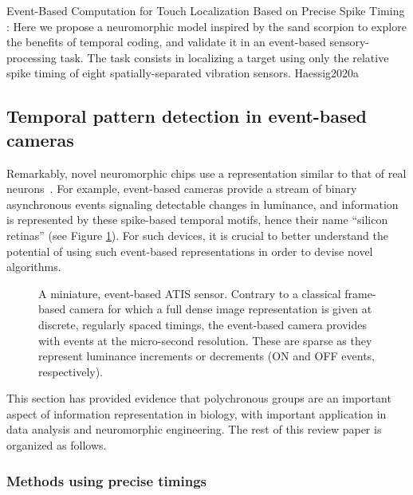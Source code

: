 \documentclass[brainsci, %
               review,submit,pdftex,moreauthors%
               ]{Definitions/mdpi}
\begin{document}
Event-Based Computation for Touch Localization Based on Precise Spike Timing : Here we propose a neuromorphic model inspired by the sand scorpion to explore the benefits of temporal coding, and validate it in an event-based sensory-processing task. The task consists in localizing a target using only the relative spike timing of eight spatially-separated vibration sensors.  Haessig2020a



\subsection{Temporal pattern detection in event-based cameras}
Remarkably, novel neuromorphic chips use a representation similar to that of real neurons~\citep{rasetto_challenges_2022}. For example, event-based cameras provide a stream of binary asynchronous events signaling detectable changes in luminance, and information is represented by these spike-based temporal motifs, hence their name ``silicon retinas'' (see Figure \ref{fig:silicon_retina}). For such devices, it is crucial to better understand the potential of using such event-based representations in order to devise novel algorithms.

\begin{figure}
\centering
\caption{A miniature, event-based ATIS sensor. Contrary to a classical frame-based camera for which a full dense image representation is given at discrete, regularly spaced timings, the event-based camera provides with events at the micro-second resolution. These are sparse as they represent luminance increments or decrements (ON and OFF events, respectively).}\label{fig:silicon_retina}
\end{figure}
This section has provided evidence that polychronous groups are an important aspect of information representation in biology, with important application in data analysis and neuromorphic engineering. The rest of this review paper is organized as follows.





\subsubsection{Methods using precise timings}
\end{document}
